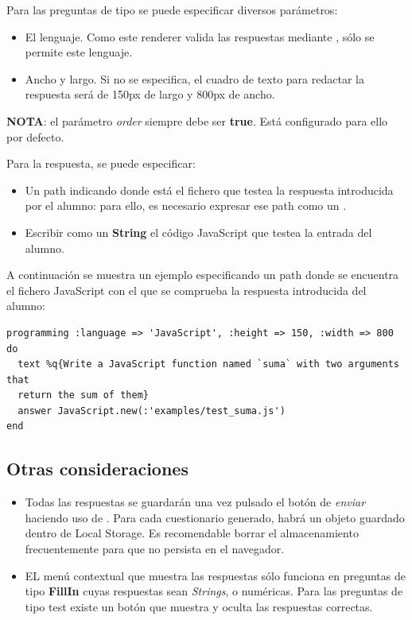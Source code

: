 Para las preguntas de tipo  se puede especificar diversos par\'ametros:
\begin{itemize}
  \item El lenguaje. Como este renderer valida las respuestas mediante , s\'olo se permite este lenguaje.
  \item Ancho y largo. Si no se especifica, el cuadro de texto para redactar la respuesta ser\'a de 150px de largo y 800px de ancho.
\end{itemize}

{\bfseries NOTA}: el par\'ametro \textit{order} siempre debe ser {\bfseries true}. Est\'a configurado para ello por defecto.
\bigskip
\bigskip

Para la respuesta, se puede especificar: 
\begin{itemize}
  \item Un path indicando donde est\'a el fichero que testea la respuesta introducida por el alumno: para ello, es necesario expresar ese path como un .
  \item Escribir como un {\bfseries String} el c\'odigo JavaScript que testea la entrada del alumno.
\end{itemize}
\bigskip

A continuaci\'on se muestra un ejemplo especificando un path donde se encuentra el fichero JavaScript con el que se comprueba la respuesta introducida del alumno:
\begin{lstlisting}
programming :language => 'JavaScript', :height => 150, :width => 800  do
  text %q{Write a JavaScript function named `suma` with two arguments that
  return the sum of them}
  answer JavaScript.new(:'examples/test_suma.js')
end
\end{lstlisting}

\subsection{Otras consideraciones}
\label{subsec:Apendice2.9}

\begin{itemize}
  \item Todas las respuestas se guardar\'an una vez pulsado el bot\'on de \textit{enviar} haciendo uso de . Para cada cuestionario generado, habr\'a 
  un objeto guardado dentro de Local Storage. Es recomendable borrar el almacenamiento frecuentemente para que no persista en el navegador.
  \item EL men\'u contextual que muestra las respuestas s\'olo funciona en preguntas de tipo {\bfseries FillIn} cuyas respuestas sean \textit{Strings},  o num\'ericas.
  Para las preguntas de tipo test existe un bot\'on que muestra y oculta las respuestas correctas.
\end{itemize}

